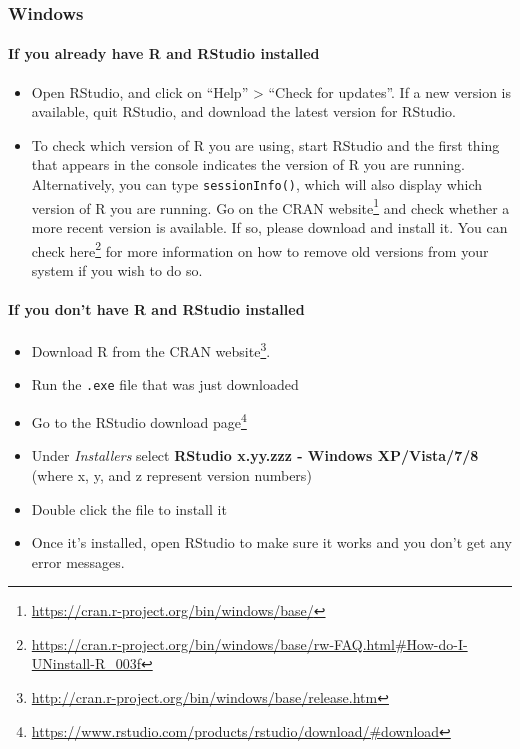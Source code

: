 \documentclass[
  12pt, krantz2,
]{book}
\providecommand{\tightlist}{%
  \setlength{\itemsep}{0pt}\setlength{\parskip}{0pt}}
\renewcommand{\href}[2]{#2\footnote{\url{#1}}}
\theoremstyle{definition}
\theoremstyle{definition}
\theoremstyle{definition}
\newcommand{\1}{\mathbbm{1}}
\begin{document}
\hypertarget{windows}{%
\subsubsection{Windows}\label{windows}}

\hypertarget{if-you-already-have-r-and-rstudio-installed}{%
\paragraph{If you already have R and RStudio installed}\label{if-you-already-have-r-and-rstudio-installed}}

\begin{itemize}
\tightlist
\item
  Open RStudio, and click on ``Help'' \textgreater{} ``Check for updates''. If a new version is
  available, quit RStudio, and download the latest version for RStudio.
\item
  To check which version of R you are using, start RStudio and the first thing
  that appears in the console indicates the version of R you are
  running. Alternatively, you can type \texttt{sessionInfo()}, which will also display
  which version of R you are running. Go on the \href{https://cran.r-project.org/bin/windows/base/}{CRAN
  website} and check whether a
  more recent version is available. If so, please download and install it. You
  can \href{https://cran.r-project.org/bin/windows/base/rw-FAQ.html\#How-do-I-UNinstall-R_003f}{check here}
  for more information on how to remove old versions from your system if you
  wish to do so.
\end{itemize}

\hypertarget{if-you-dont-have-r-and-rstudio-installed}{%
\paragraph{If you don't have R and RStudio installed}\label{if-you-dont-have-r-and-rstudio-installed}}

\begin{itemize}
\tightlist
\item
  Download R from
  the \href{http://cran.r-project.org/bin/windows/base/release.htm}{CRAN website}.
\item
  Run the \texttt{.exe} file that was just downloaded
\item
  Go to the \href{https://www.rstudio.com/products/rstudio/download/\#download}{RStudio download
  page}
\item
  Under \emph{Installers} select \textbf{RStudio x.yy.zzz - Windows
  XP/Vista/7/8} (where x, y, and z represent version numbers)
\item
  Double click the file to install it
\item
  Once it's installed, open RStudio to make sure it works and you don't get any
  error messages.
\end{itemize}
\end{document}
